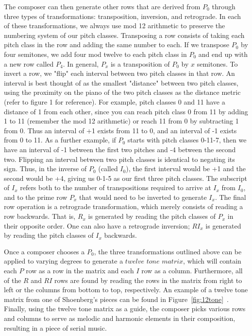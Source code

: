 The composer can then generate other rows that are derived from $P_0$ through three types of transformations:
transposition, inversion, and retrograde. In each of these transformations, we always use mod 12 arithmetic to preserve the 
numbering system of our pitch classes. Transposing a row consists of taking each pitch class in the row and adding the same number 
to each. If we transpose $P_0$ by four semitones, we add four mod twelve to each pitch class in $P_0$ and end up with a new row 
called $P_4$. In general, $P_x$ is a transposition of $P_0$ by $x$ semitones. To invert a row, we "flip" each interval between two 
pitch classes in that row. An interval is best thought of as the smallest "distance" between two pitch classes, using the proximity
on the piano of the two pitch classes as the distance metric (refer to figure 1 for reference). 
For example, pitch classes 0 and 11 have a distance of 1 from each other,
since you can reach pitch class 0 from 11 by adding 1 to 11 (remember the mod 12 arithmetic) or reach 11 from 0 by subtracting 1
from 0. Thus an interval of +1 exists from 11 to 0, and an interval of -1 exists from 0 to 11.
As a further example, if $P_0$ starts with pitch classes 0-11-7, then we have an interval of -1 between the first two 
pitches and -4  between the second two. Flipping an interval between two pitch classes is identical to
negating its sign.
Thus, in the inverse of $P_0$ (called $I_0$), the first interval would be +1 and the second would 
be +4, giving us 0-1-5 as our first three pitch classes.  The subscript of $I_x$  refers both to the number of transpositions required 
to arrive at $I_x$ from $I_0$, and to the prime row $P_x$ that would need to be inverted to generate $I_x$. The final row 
operation is a retrograde transformation, which merely consists of reading a row backwards. That is, $R_x$ is generated by reading 
the pitch classes of $P_x$ in their opposite order. One can also have a retrograde inversion; $RI_x$ is generated by reading the 
pitch classes of $I_x$ backwards.

Once a composer chooses a $P_0$, the three transformations outlined above can be applied to varying degrees to generate a $twelve$ $tone$ $matrix$, which will contain each $P$ row as a row in the matrix and each $I$ row as a column.
Furthermore, all of the $R$ and $RI$ rows are found by reading the rows in the matrix from right to left or the columns 
from bottom to top, respectively. An example of a 
twelve tone matrix from one of Shoenberg's pieces can be found in Figure~\ref{fig:12tone}~\cite{devoto2013twelve}. Finally, using the twelve tone matrix as a guide,
	   the composer picks various rows and columns to serve as melodic and harmonic elements in their composition, resulting in a piece
	   of serial music.

